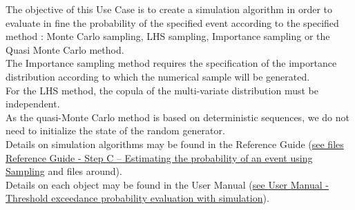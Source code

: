 \renewcommand{\filename}{docUC_ThresholdExceedance_SimulationAlgorithm.tex}
\renewcommand{\filetitle}{UC : Creation of a Monte Carlo / LHS / Quasi Monte Carlo / Importance Sampling simulation algorithm}

\HeaderIIILevel


\label{simuAlgo}






The objective of this Use Case is to create a simulation algorithm in order to evaluate in fine the probability of the specified event according to the specified method : Monte Carlo sampling, LHS sampling, Importance sampling or the Quasi Monte Carlo method.\\

The Importance sampling method requires the specification of the importance distribution according to which the numerical sample will be generated.\\

For the LHS method, the copula of the multi-variate distribution must be independent.\\

As the quasi-Monte Carlo method is based on deterministic sequences, we do not need to initialize the state of the random generator.\\



Details on simulation algorithms may be found in the Reference Guide (\href{OpenTURNS_ReferenceGuide.pdf}{see files Reference Guide - Step C -- Estimating the probability of an event using Sampling} and files around).\\

Details on each object may be found in the User Manual  (\href{OpenTURNS_UserManual_TUI.pdf}{see User Manual - Threshold exceedance probability evaluation with simulation}).\\


